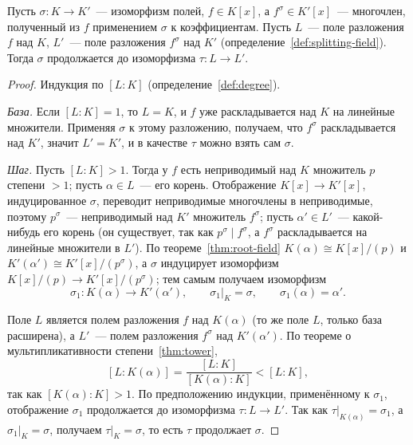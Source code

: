 \documentclass[12pt]{article}
\begin{document}
	\begin{lemma}\label{lem:extend-iso}
		Пусть $\sigma: K \to K'$~--- изоморфизм полей, $f \in K[x]$, а $f^\sigma \in K'[x]$~--- многочлен, полученный из $f$ применением $\sigma$ к коэффициентам. Пусть $L$~--- поле разложения $f$ над $K$, $L'$~--- поле разложения $f^\sigma$ над $K'$ (определение~\ref{def:splitting-field}). Тогда $\sigma$ продолжается до изоморфизма $\tau: L \to L'$.
	\end{lemma}
	\begin{proof}
		Индукция по $[L:K]$ (определение~\ref{def:degree}).

		\emph{База.} Если $[L:K]=1$, то $L=K$, и $f$ уже раскладывается над $K$ на линейные множители. Применяя $\sigma$ к этому разложению, получаем, что $f^\sigma$ раскладывается над $K'$, значит $L'=K'$, и в качестве $\tau$ можно взять сам $\sigma$.

		\emph{Шаг.} Пусть $[L:K]>1$. Тогда у $f$ есть неприводимый над $K$ множитель $p$ степени $>1$; пусть $\alpha \in L$~--- его корень. Отображение $K[x]\to K'[x]$, индуцированное $\sigma$, переводит неприводимые многочлены в неприводимые, поэтому $p^\sigma$~--- неприводимый над $K'$ множитель $f^\sigma$; пусть $\alpha' \in L'$~--- какой-нибудь его корень (он существует, так как $p^\sigma \mid f^\sigma$, а $f^\sigma$ раскладывается на линейные множители в $L'$). По теореме~\ref{thm:root-field} $K(\alpha) \cong K[x]/(p)$ и $K'(\alpha') \cong K'[x]/(p^\sigma)$, а $\sigma$ индуцирует изоморфизм $K[x]/(p) \to K'[x]/(p^\sigma)$; тем самым получаем изоморфизм
		\[
			\sigma_1: K(\alpha) \to K'(\alpha'), \qquad \sigma_1|_K = \sigma, \qquad \sigma_1(\alpha)=\alpha'.
		\]

		Поле $L$ является полем разложения $f$ над $K(\alpha)$ (то же поле $L$, только база расширена), а $L'$~--- полем разложения $f^\sigma$ над $K'(\alpha')$. По теореме о мультипликативности степени~\ref{thm:tower},
		\[
			[L:K(\alpha)] = \frac{[L:K]}{[K(\alpha):K]} < [L:K],
		\]
		так как $[K(\alpha):K]>1$. По предположению индукции, применённому к $\sigma_1$, отображение $\sigma_1$ продолжается до изоморфизма $\tau: L \to L'$. Так как $\tau|_{K(\alpha)}=\sigma_1$, а $\sigma_1|_K=\sigma$, получаем $\tau|_K=\sigma$, то есть $\tau$ продолжает $\sigma$.
	\end{proof}
\end{document}
